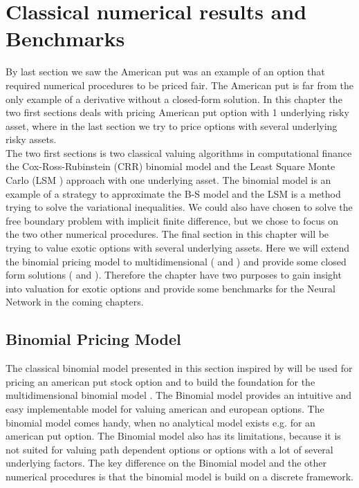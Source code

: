 
\chapter{Classical numerical results and Benchmarks} %

\label{Chapter3} %

By last section we saw the American put was an example of an option that required numerical procedures to be priced fair. The American put is far from the only example of a derivative without a closed-form solution. In this chapter the two first sections deals with pricing American put option with 1 underlying risky asset, where in the last section we try to price options with several underlying risky assets. \\

The two first sections is two classical valuing algorithms in computational finance the Cox-Ross-Rubinstein (CRR) binomial model \parencite{CRR} and the Least Square Monte Carlo (LSM \parencite{lsm}) approach with one underlying asset. The binomial model is an example of a strategy to approximate the B-S model and the LSM is a method trying to solve the variational inequalities. We could also have chosen to solve the free boundary problem with implicit finite difference, but we chose to focus on the two other numerical procedures. The final section in this chapter will be trying to value exotic options with several underlying assets. Here we will extend the binomial pricing model to multidimensional (\parencite{NEK} and \parencite{BEG}) and provide some closed form solutions (\parencite{Johnson87} and \parencite{Ouwehand2006}). Therefore the chapter have two purposes to gain insight into valuation for exotic options and provide some benchmarks for the Neural Network in the coming chapters.

\section{Binomial Pricing Model}
The classical binomial model presented in this section inspired by \parencite{CRR} \parencite{Hull} \parencite{finKont} will be used for pricing an american put stock option and to build the foundation for the multidimensional binomial model \parencite{BEG}. The Binomial model provides an intuitive and easy implementable model for valuing american and european options. The binomial model comes handy, when no analytical model exists e.g. for an american put option. The Binomial model also has its limitations, because it is not suited for valuing path dependent options or options with a lot of several underlying factors. The key difference on the Binomial model and the other numerical procedures is that the binomial model is build on a discrete framework. \\

